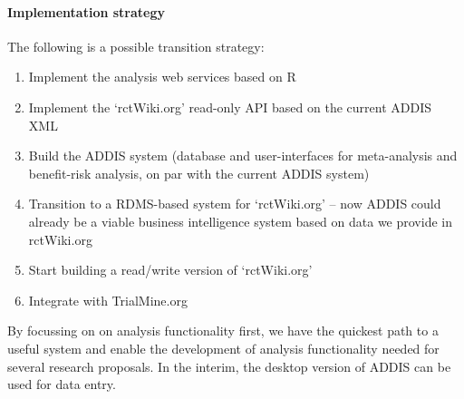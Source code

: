 \documentclass[a4paper]{article}
\begin{document}
\paragraph{Implementation strategy}
The following is a possible transition strategy:
\begin{enumerate}
\item Implement the analysis web services based on R
\item Implement the `rctWiki.org' read-only API based on the current ADDIS XML
\item Build the ADDIS system (database and user-interfaces for meta-analysis and benefit-risk analysis, on par with the current ADDIS system)
\item Transition to a RDMS-based system for `rctWiki.org' -- now ADDIS could already be a viable business intelligence system based on data we provide in rctWiki.org
\item Start building a read/write version of `rctWiki.org'
\item Integrate with TrialMine.org
\end{enumerate}
By focussing on on analysis functionality first, we have the quickest path to a useful system and enable the development of analysis functionality needed for several research proposals.
In the interim, the desktop version of ADDIS can be used for data entry.
\end{document}
